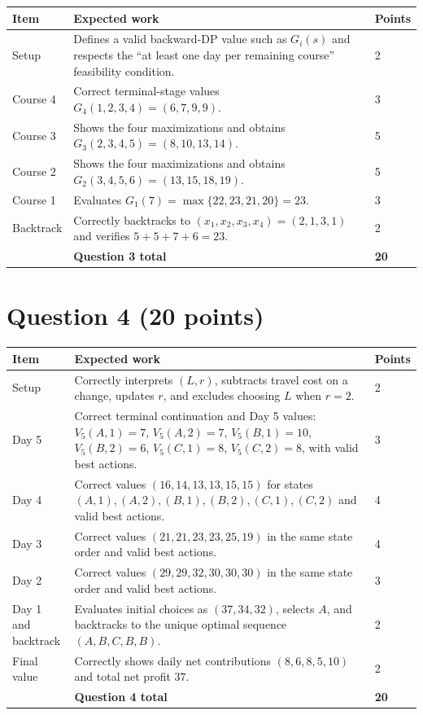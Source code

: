 \documentclass[11pt,letterpaper]{article}
\newcommand{\rubricsection}[2]{%
  \section*{\color{hkustblue}Question #1 \normalfont\normalsize (#2 points)}
}
\begin{document}
\begin{longtable}{L{0.12\textwidth}L{0.72\textwidth}C{0.08\textwidth}}
\toprule
Item & Expected work & Points \\
\midrule
Setup & Defines a valid backward-DP value such as $G_i(s)$ and respects the
``at least one day per remaining course'' feasibility condition. & 2\\
Course 4 & Correct terminal-stage values $G_4(1,2,3,4)=(6,7,9,9)$. & 3\\
Course 3 & Shows the four maximizations and obtains
$G_3(2,3,4,5)=(8,10,13,14)$. & 5\\
Course 2 & Shows the four maximizations and obtains
$G_2(3,4,5,6)=(13,15,18,19)$. & 5\\
Course 1 & Evaluates
$G_1(7)=\max\{22,23,21,20\}=23$. & 3\\
Backtrack & Correctly backtracks to $(x_1,x_2,x_3,x_4)=(2,1,3,1)$ and verifies
$5+5+7+6=23$. & 2\\
\midrule
& \textbf{Question 3 total} & \textbf{20}\\
\bottomrule
\end{longtable}

\rubricsection{4}{20}

\begin{longtable}{L{0.12\textwidth}L{0.72\textwidth}C{0.08\textwidth}}
\toprule
Item & Expected work & Points \\
\midrule
Setup & Correctly interprets $(L,r)$, subtracts travel cost on a change, updates
$r$, and excludes choosing $L$ when $r=2$. & 2\\
Day 5 & Correct terminal continuation and Day 5 values:
$V_5(A,1)=7$, $V_5(A,2)=7$, $V_5(B,1)=10$, $V_5(B,2)=6$,
$V_5(C,1)=8$, $V_5(C,2)=8$, with valid best actions. & 3\\
Day 4 & Correct values $(16,14,13,13,15,15)$ for states
$(A,1),(A,2),(B,1),(B,2),(C,1),(C,2)$ and valid best actions. & 4\\
Day 3 & Correct values $(21,21,23,23,25,19)$ in the same state order and valid
best actions. & 4\\
Day 2 & Correct values $(29,29,32,30,30,30)$ in the same state order and valid
best actions. & 3\\
Day 1 and backtrack & Evaluates initial choices as $(37,34,32)$, selects $A$, and
backtracks to the unique optimal sequence $(A,B,C,B,B)$. & 2\\
Final value & Correctly shows daily net contributions $(8,6,8,5,10)$ and total
net profit $37$. & 2\\
\midrule
& \textbf{Question 4 total} & \textbf{20}\\
\bottomrule
\end{longtable}
\end{document}
